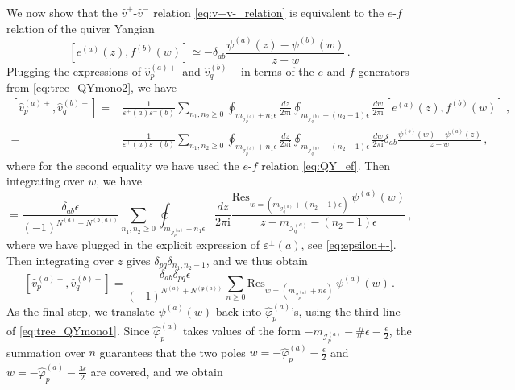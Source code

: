 \documentclass[12pt,a4paper]{article}
\renewcommand{\(}{\left(}
\renewcommand{\)}{\right)}
\renewcommand{\(}{\left(}
\renewcommand{\)}{\right)}
\begin{document}
We now show that the $\hat{v}^+$-$\hat{v}^-$ relation \eqref{eq:v+v-_relation} is equivalent to the $e$-$f$ relation of the quiver Yangian
\begin{equation}\label{eq:QY_ef}
[e^{(a)}(z),f^{(b)}(w)]\simeq -\delta_{ab}\frac{\psi^{(a)}(z)-\psi^{(b)}(w)}{z-w}\,.
\end{equation}
Plugging the expressions of $\hat{v}^{(a)+}_p$ and $\hat{v}^{(b)-}_q$ in terms of the $e$ and $f$ generators from \eqref{eq:tree_QYmono2}, we have 
\begin{equation}
\begin{aligned}
[\hat{v}^{(a)+}_p,\hat{v}^{(b)-}_q]=&\frac{1}{\varepsilon^+(a)\varepsilon^-(b)} \sum_{n_1,n_2\geq 0} \oint_{m_{\mathcal{I}^{(a)}_{p}}+n_1\epsilon}\frac{dz}{2\pi \text{i}} \oint_{m_{\mathcal{I}^{(b)}_{q}}+(n_2-1)\epsilon}\frac{dw}{2\pi \text{i}}[e^{(a)}(z),f^{(b)}(w)]\,,\\
=&\frac{1}{\varepsilon^+(a)\varepsilon^-(b)} \sum_{n_1,n_2\geq 0} \oint_{m_{\mathcal{I}^{(a)}_{p}}+n_1\epsilon}\frac{dz}{2\pi \text{i}} \oint_{m_{\mathcal{I}^{(b)}_{q}}+(n_2-1)\epsilon}\frac{dw}{2\pi \text{i}}\delta_{ab}\frac{\psi^{(b)}(w)-\psi^{(a)}(z)}{z-w}\,,
\end{aligned}
\end{equation}
where for the second equality we have used the $e$-$f$ relation \eqref{eq:QY_ef}. 
Then integrating over $w$,  we have
\begin{equation}
[\hat{v}^{(a)+}_p,\hat{v}^{(b)-}_q]=\frac{\delta_{ab}\epsilon}{(-1)^{N^{(a)}+N^{(\mathfrak{p}(a))}}}\sum_{n_1,n_2\geq 0}\oint_{m_{\mathcal{I}^{(a)}_{p}}+n_1\epsilon}\frac{dz}{2\pi \text{i}}\frac{\text{Res}_{w=(m_{\mathcal{I}^{(a)}_{q}}+(n_2-1)\epsilon)}\ \psi^{(a)}(w)}{z-m_{\mathcal{I}^{(a)}_{q}}-(n_2-1)\epsilon}\,,
\end{equation}
where we have plugged in the explicit expression of $\varepsilon^\pm(a)$, see \eqref{eq:epsilon+-}. Then integrating over $z$ gives $\delta_{pq}\delta_{n_1,n_2-1}$, and we thus obtain
\begin{equation}\label{eq:v+v-_proof}
[\hat{v}^{(a)+}_p,\hat{v}^{(b)-}_q]=\frac{\delta_{ab}\delta_{pq}\epsilon}{(-1)^{N^{(a)}+N^{(\mathfrak{p}(a))}}}\sum_{n\geq 0} \text{Res}_{w=(m_{\mathcal{I}^{(a)}_{p}}+n\epsilon)}\ \psi^{(a)}(w)\,.
\end{equation}
As the final step, we translate $\psi^{(a)}(w)$ back into $\hat{\varphi}^{(a)}_p$'s, using the third line of \eqref{eq:tree_QYmono1}. Since $\hat{\varphi}^{(a)}_p$ takes values of the form $-m_{\mathcal{I}^{(a)}_{p}}-\#\epsilon-\frac{\epsilon}{2}$, the summation over $n$ guarantees that the two poles $w=-\hat{\varphi}^{(a)}_p-\frac{\epsilon}{2}$ and $w=-\hat{\varphi}^{(a)}_p-\frac{3\epsilon}{2}$ are covered, and we obtain
\end{document}
